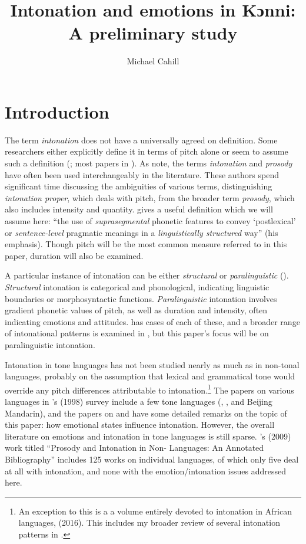 \documentclass[output=paper]{langsci/langscibook}
\title{Intonation and emotions in Kɔnni: A preliminary study}
\author{%
 Michael Cahill\affiliation{SIL International} 
}
\begin{document}
\section{Introduction}
The term \emph{intonation} does not have a universally agreed on definition. Some researchers either explicitly define it in terms of pitch alone or seem to assume such a definition (\citealt{lieberman1967}; most papers in \citealt{bolinger1972,gussenhoven2004}). As \citet[3]{hirstdicristo1998} note, the terms \emph{intonation} and \emph{prosody} have often been used interchangeably in the literature. These authors spend significant time discussing the ambiguities of various terms, distinguishing \emph{intonation proper}, which deals with pitch, from the broader term \emph{prosody}, which also includes intensity and quantity. \citet[4]{ladd2008} gives a useful definition which we will assume here: ``the use of \emph{suprasegmental} phonetic features to convey `postlexical' or \emph{sentence-level} pragmatic meanings in a \emph{linguistically structured} way'' (his emphasis). Though pitch will be the most common measure referred to in this paper, duration will also be examined. 

A particular instance of intonation can be either \emph{structural} or \emph{paralinguistic} (\citealt{gussenhoven2004,laddetal1986,ladd2008}). 
\emph{Structural} intonation is categorical and phonological, indicating linguistic boundaries or morphosyntactic functions. \emph{Paralinguistic} intonation involves gradient phonetic values of pitch, as well as duration and intensity, often indicating emotions and attitudes.  has cases of each of these, and a broader range of intonational patterns 
is examined in \citet{cahill2016intonation}, but this paper's focus will be on paralinguistic intonation.

Intonation in tone languages has not been studied nearly as much as in non-tonal languages, probably on the assumption that lexical and grammatical tone would override any pitch differences attributable to intonation.\footnote{An exception to this is a a volume entirely devoted to intonation in African languages, \citeauthor{downingrialland2016} (2016). This includes my broader review of several intonation patterns in .} The papers on various languages in \citeauthor{hirstdicristo1998}'s (1998) survey include a few tone languages (, , and Beijing Mandarin), and the papers on  and  have some detailed remarks on the topic of this paper: how emotional states influence intonation. However, the overall literature on emotions and intonation in tone languages is still sparse. \citeauthor{green2009}'s (2009) work titled ``Prosody and Intonation in Non-  Languages: An Annotated Bibliography'' includes 125 works on individual languages, of which only five deal at all with intonation, and none with the emotion/intonation issues addressed here. 
\end{document}
